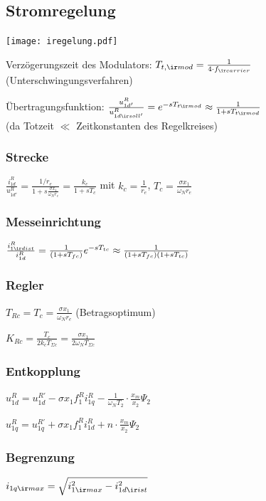 \documentclass[fs, german]{latex4ei_fs}
\begin{document}
\begin{sectionbox}
\subsection{Stromregelung}
\texttt{[image: iregelung.pdf]}

Verzögerungszeit des Modulators: $T_{t, \ir mod} = \frac{1}{4 \cdot f_{\ir carrier}}$ (Unterschwingungsverfahren)

Übertragungsfunktion: $\frac{u_{1d'}^R}{u_{1d \ir soll'}^R} = e^{- s T_{t \ir mod}} \approx \frac{1}{1 + s T_{t \ir mod}}$\\
(da Totzeit $\ll$ Zeitkonstanten des Regelkreises)

\subsubsection*{Strecke} $\frac{i_{1d}^R}{u_{1d'}^R} = \frac{1 / r_e}{1 + s \frac{\sigma x_1}{\omega_N r_e}} = \frac{k_c}{1 + sT_c}$ mit $k_c = \frac{1}{r_e}$, $T_c = \frac{\sigma x_1}{\omega_N r_e}$

\subsubsection*{Messeinrichtung}
$\frac{i_{1 \ir dist}^R}{i_{1d}^R} = \frac{1}{(1 + s T_{fc})} e^{-s T_{tc}} \approx \frac{1}{(1 + s T_{fc}) (1 + s T_{tc})}$ 

\subsubsection*{Regler}

$T_{Rc} = T_c  = \frac{\sigma x_1}{\omega_N r_e}$ (Betragsoptimum)

$K_{Rc} = \frac{T_c}{2 k_c T_{\Sigma c}} = \frac{\sigma x_1}{2 \omega_N T_{\Sigma c}}$ 

\subsubsection*{Entkopplung}

$u_{1d}^R = u_{1d}^{R'} - \sigma x_1 f_1^R i_{1q}^R - \frac{1}{\omega_N T_2} \cdot \frac{x_m}{x_2} \Psi_2$

$u_{1q}^R = u_{1q}^{R '} + \sigma x_1 f_1^R i_{1d}^R + n \cdot \frac{x_m}{x_2} \Psi_2$ 

\subsubsection*{Begrenzung}

$i_{1q \ir max} = \sqrt{i_{1\ir max}^2 - i_{1d \ir ist}^2} $ 
\end{sectionbox}
\end{document}

